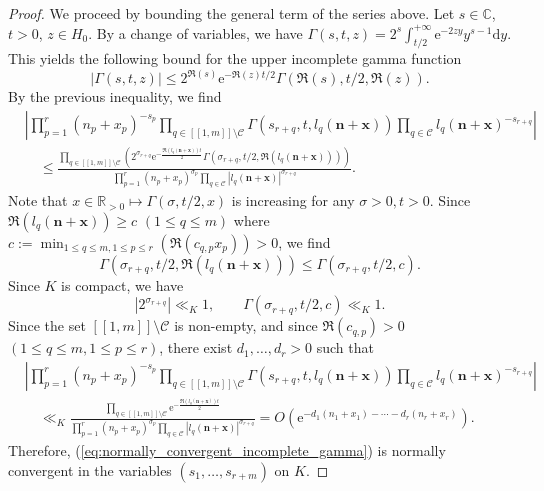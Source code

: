 \documentclass[a4paper]{amsart}
\theoremstyle{remark}
\theoremstyle{definition}
\newcommand{\dd}{\mathrm{d}}
\newcommand{\phie}{\mathrm{e}}
\begin{document}
\begin{proof}
We proceed by bounding the general term of the series above. Let $s \in \mathbb{C}$, $t>0$, $z \in H_0$. By a change of variables, we have
$\Gamma(s,t,z) = 2^s \int_{t/2}^{+\infty} \phie^{-2z y} y^{s-1} \dd y$. This yields the following bound for the upper incomplete gamma function
\begin{equation}
    |\Gamma(s,t,z)| \leq 2^{\Re(s)} \phie^{-\Re(z) t/2} \Gamma(\Re(s),t/2,\Re(z)). \label{eq:bound_incomplete_gamma_function}
\end{equation}
By the previous inequality, we find
\begin{align*}
    & \left| \prod_{p=1}^{r} (n_p+x_p)^{-s_p} \prod_{q \in [\![ 1,m ]\!] \setminus \mathcal{C}} \Gamma(s_{r+q},t,l_q(\mathbf{n}+\mathbf{x})) \prod_{q \in \mathcal{C}} l_q(\mathbf{n}+\mathbf{x})^{-s_{r+q}} \right| \\
    & \quad \leq \frac{\prod_{q \in [\![ 1,m ]\!] \setminus \mathcal{C}} \left( 2^{\sigma_{r+q}} \phie^{-\frac{\Re(l_q(\mathbf{n}+\mathbf{x}))t}{2}} \Gamma(\sigma_{r+q},t/2,\Re(l_q(\mathbf{n}+\mathbf{x})))\right)}{\prod_{p=1}^{r} (n_p+x_p)^{\sigma_p} \prod_{q \in \mathcal{C}} |l_q(\mathbf{n}+\mathbf{x})|^{\sigma_{r+q}}}.
\end{align*}
Note that $x \in \mathbb{R}_{>0} \mapsto \Gamma(\sigma,t/2,x)$ is increasing for any $\sigma>0, t>0$. Since $\Re(l_q(\mathbf{n}+\mathbf{x})) \geq c$ $(1 \leq q \leq m)$ where $c:=\min_{1 \leq q \leq m, 1 \leq p \leq r}(\Re(c_{q,p}x_p))>0$, we find 
$$\Gamma(\sigma_{r+q},t/2,\Re(l_q(\mathbf{n}+\mathbf{x}))) \leq \Gamma(\sigma_{r+q},t/2,c). $$ 
Since $K$ is compact, we have
$$ |2^{\sigma_{r+q}}| \ll_K 1, \qquad \Gamma(\sigma_{r+q},t/2,c) \ll_K 1. $$
Since the set $[\![ 1,m ]\!] \setminus \mathcal{C}$ is non-empty, and since $\Re(c_{q,p})>0$ $(1 \leq q \leq m, 1 \leq p \leq r)$, there exist $d_1,\ldots,d_r>0$ such that
\begin{align*}
    & \left| \prod_{p=1}^{r} (n_p+x_p)^{-s_p} \prod_{q \in [\![ 1,m ]\!] \setminus \mathcal{C}} \Gamma(s_{r+q},t,l_q(\mathbf{n}+\mathbf{x})) \prod_{q \in \mathcal{C}} l_q(\mathbf{n}+\mathbf{x})^{-s_{r+q}} \right| \\
    & \quad \ll_K \frac{\prod_{q \in [\![ 1,m ]\!] \setminus \mathcal{C}} \phie^{-\frac{\Re(l_q(\mathbf{n}+\mathbf{x}))t}{2}}}{\prod_{p=1}^{r} (n_p+x_p)^{\sigma_p} \prod_{q \in \mathcal{C}} |l_q(\mathbf{n}+\mathbf{x})|^{\sigma_{r+q}}}=O(\phie^{-d_1(n_1+x_1)-\cdots-d_r(n_r+x_r)}).
\end{align*}
Therefore, (\ref{eq:normally_convergent_incomplete_gamma}) is normally convergent in the variables $(s_1,\ldots,s_{r+m})$ on $K$.
\end{proof}
\end{document}

